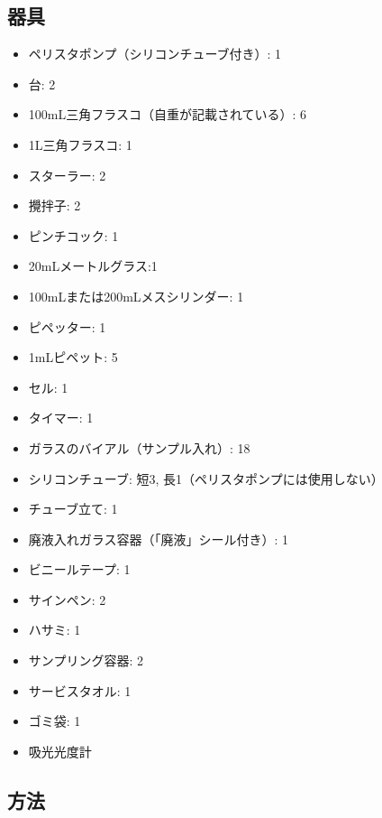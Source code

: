 \documentclass{jsarticle}
\begin{document}
\subsection{器具}
\begin{itemize}
    \item ペリスタポンプ（シリコンチューブ付き）: 1
    \item 台: 2
    \item 100mL三角フラスコ（自重が記載されている）: 6
    \item 1L三角フラスコ: 1
    \item スターラー: 2
    \item 攪拌子: 2
    \item ピンチコック: 1
    \item 20mLメートルグラス:1
    \item 100mLまたは200mLメスシリンダー: 1
    \item ピペッター: 1
    \item 1mLピペット: 5
    \item セル: 1
    \item タイマー: 1
    \item ガラスのバイアル（サンプル入れ）: 18
    \item シリコンチューブ: 短3, 長1（ペリスタポンプには使用しない）
    \item チューブ立て: 1
    \item 廃液入れガラス容器（「廃液」シール付き）: 1
    \item ビニールテープ: 1
    \item サインペン: 2
    \item ハサミ: 1
    \item サンプリング容器: 2
    \item サービスタオル: 1
    \item ゴミ袋: 1
    \item 吸光光度計
\end{itemize}

\subsection{方法}
\end{document}
